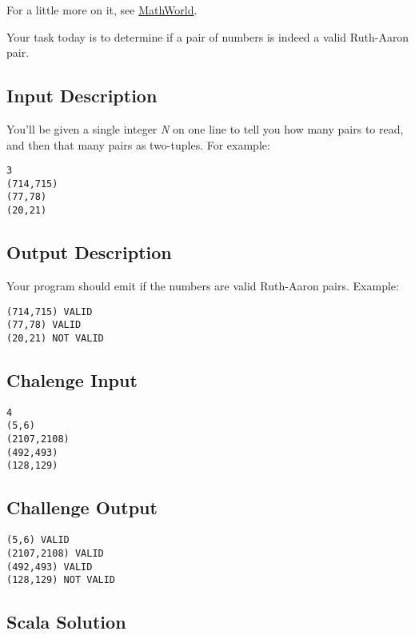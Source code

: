 For a little more on it, see
\href{http://mathworld.wolfram.com/Ruth-AaronPair.html}{MathWorld}.

Your task today is to determine if a pair of numbers is indeed a valid
Ruth-Aaron pair.

\subsection*{Input Description}\label{input-description-6}

You'll be given a single integer \emph{N} on one line to tell you how
many pairs to read, and then that many pairs as two-tuples. For example:

\begin{lstlisting}
3
(714,715)
(77,78)
(20,21)
\end{lstlisting}

\subsection*{Output Description}\label{output-description-6}

Your program should emit if the numbers are valid Ruth-Aaron pairs.
Example:

\begin{lstlisting}
(714,715) VALID
(77,78) VALID
(20,21) NOT VALID
\end{lstlisting}

\subsection*{Chalenge Input}\label{chalenge-input}

\begin{lstlisting}
4
(5,6) 
(2107,2108) 
(492,493) 
(128,129) 
\end{lstlisting}

\subsection*{Challenge Output}\label{challenge-output-4}

\begin{lstlisting}
(5,6) VALID
(2107,2108) VALID
(492,493) VALID
(128,129) NOT VALID
\end{lstlisting}

\subsection*{Scala Solution}\label{scala-solution-6}

